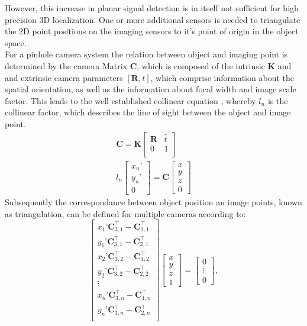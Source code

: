 \documentclass[5p,times,procedia]{elsarticle}
\begin{document}
However, this increase in planar signal detection is in itself not sufficient for high precision 3D localization. One or more additional sensors is needed to triangulate the 2D point positions on the imaging sensors to it’s point of origin in the object space. \\
For a pinhole camera system the relation between object and imaging point is determined by the camera Matrix $\mathbf{C}$, which is composed of the intrinsic $\mathbf{K}$ and  and extrinsic camera parameters $[\mathbf{R}, t]$, which comprise information about the spatial orientation, as well as the information about focal width and
image scale factor. This leads to the well established collinear equation \cite{Luhmann2003}, whereby $l_n$ is the collinear factor, which describes the line of sight between the object and image point.
%
\begin{align}
	\mathbf{C} = \mathbf{K}
	\begin{bmatrix}
		\mathbf{R} & \hat{t} \\
		0 & 1 \\
	\end{bmatrix} \\
	l_{n}
	\begin{bmatrix}
		x_n’ \\
		y_n’ \\
		0
	\end{bmatrix}
	= \mathbf{C}
	\begin{bmatrix}
		x \\
		y \\
		z \\
		0
	\end{bmatrix}
\end{align}
Subsequently the correspondance between object position an image points, known as triangulation, can be defined for multiple cameras according to:
%
\begin{equation}
	\label{eqn:triangulation}
	\begin{bmatrix}
		x_{1}’ \mathbf{C}_{3,1}^{\top} - \mathbf{C}_{1,1}^{\top}\\
		y_{1}’ \mathbf{C}_{3,1}^{\top} - \mathbf{C}_{2,1}^{\top}\\
		x_{2}’ \mathbf{C}_{3,2}^{\top} - \mathbf{C}_{1,2}^{\top}\\
		y_{2}’ \mathbf{C}_{3,2}^{\top} - \mathbf{C}_{2,2}^{\top}\\
		\vdots \\
		x_{n}’ \mathbf{C}_{3,n}^{\top} - \mathbf{C}_{1,n}^{\top}\\
		y_{n}’ \mathbf{C}_{3,n}^{\top} - \mathbf{C}_{2,n}^{\top}\\
	\end{bmatrix}
	\begin{bmatrix}
		x \\
		y \\
		z \\
		1
	\end{bmatrix}
	=
	\begin{bmatrix}
		0 \\
		\vdots \\
		0
	\end{bmatrix},
\end{equation}
\end{document}
